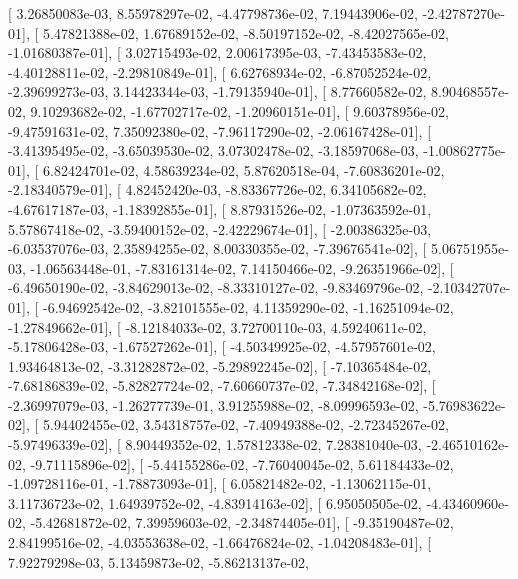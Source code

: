 \documentclass{article}
\begin{document}
       [  3.26850083e-03,   8.55978297e-02,  -4.47798736e-02,
          7.19443906e-02,  -2.42787270e-01],
       [  5.47821388e-02,   1.67689152e-02,  -8.50197152e-02,
         -8.42027565e-02,  -1.01680387e-01],
       [  3.02715493e-02,   2.00617395e-03,  -7.43453583e-02,
         -4.40128811e-02,  -2.29810849e-01],
       [  6.62768934e-02,  -6.87052524e-02,  -2.39699273e-03,
          3.14423344e-03,  -1.79135940e-01],
       [  8.77660582e-02,   8.90468557e-02,   9.10293682e-02,
         -1.67702717e-02,  -1.20960151e-01],
       [  9.60378956e-02,  -9.47591631e-02,   7.35092380e-02,
         -7.96117290e-02,  -2.06167428e-01],
       [ -3.41395495e-02,  -3.65039530e-02,   3.07302478e-02,
         -3.18597068e-03,  -1.00862775e-01],
       [  6.82424701e-02,   4.58639234e-02,   5.87620518e-04,
         -7.60836201e-02,  -2.18340579e-01],
       [  4.82452420e-03,  -8.83367726e-02,   6.34105682e-02,
         -4.67617187e-03,  -1.18392855e-01],
       [  8.87931526e-02,  -1.07363592e-01,   5.57867418e-02,
         -3.59400152e-02,  -2.42229674e-01],
       [ -2.00386325e-03,  -6.03537076e-03,   2.35894255e-02,
          8.00330355e-02,  -7.39676541e-02],
       [  5.06751955e-03,  -1.06563448e-01,  -7.83161314e-02,
          7.14150466e-02,  -9.26351966e-02],
       [ -6.49650190e-02,  -3.84629013e-02,  -8.33310127e-02,
         -9.83469796e-02,  -2.10342707e-01],
       [ -6.94692542e-02,  -3.82101555e-02,   4.11359290e-02,
         -1.16251094e-02,  -1.27849662e-01],
       [ -8.12184033e-02,   3.72700110e-03,   4.59240611e-02,
         -5.17806428e-03,  -1.67527262e-01],
       [ -4.50349925e-02,  -4.57957601e-02,   1.93464813e-02,
         -3.31282872e-02,  -5.29892245e-02],
       [ -7.10365484e-02,  -7.68186839e-02,  -5.82827724e-02,
         -7.60660737e-02,  -7.34842168e-02],
       [ -2.36997079e-03,  -1.26277739e-01,   3.91255988e-02,
         -8.09996593e-02,  -5.76983622e-02],
       [  5.94402455e-02,   3.54318757e-02,  -7.40949388e-02,
         -2.72345267e-02,  -5.97496339e-02],
       [  8.90449352e-02,   1.57812338e-02,   7.28381040e-03,
         -2.46510162e-02,  -9.71115896e-02],
       [ -5.44155286e-02,  -7.76040045e-02,   5.61184433e-02,
         -1.09728116e-01,  -1.78873093e-01],
       [  6.05821482e-02,  -1.13062115e-01,   3.11736723e-02,
          1.64939752e-02,  -4.83914163e-02],
       [  6.95050505e-02,  -4.43460960e-02,  -5.42681872e-02,
          7.39959603e-02,  -2.34874405e-01],
       [ -9.35190487e-02,   2.84199516e-02,  -4.03553638e-02,
         -1.66476824e-02,  -1.04208483e-01],
       [  7.92279298e-03,   5.13459873e-02,  -5.86213137e-02,
\end{document}
